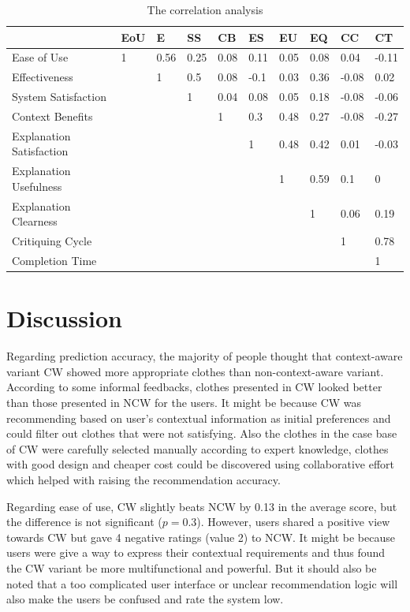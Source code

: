 \begin{table}[H]
	\centering
	\caption{The correlation analysis}
	\label{tab:correlation}
	\small
	\begin{tabular}{p{1.2in}p{0.3in}p{0.3in}p{0.3in}p{0.3in}p{0.3in}p{0.3in}p{0.3in}p{0.3in}p{0.3in}}
	          \hline
		 & EoU & E & SS & CB & ES & EU & EQ & CC & CT \\ \hline
		Ease of Use & 1 & 0.56 & 0.25 & 0.08 & 0.11 & 0.05 & 0.08 & 0.04 & -0.11 \\
		Effectiveness &  & 1 & 0.5 & 0.08 & -0.1 & 0.03 & 0.36 & -0.08 & 0.02 \\
		System Satisfaction &  &  & 1 & 0.04 & 0.08 & 0.05 & 0.18 & -0.08 & -0.06 \\
		Context Benefits &  &  &  & 1 & 0.3 & 0.48 & 0.27 & -0.08 & -0.27 \\
		Explanation Satisfaction &  &  &  &  & 1 & 0.48 & 0.42 & 0.01 & -0.03 \\
		Explanation Usefulness &  &  &  &  &  & 1 & 0.59 & 0.1 & 0 \\
		Explanation Clearness &  &  &  &  &  &  & 1 & 0.06 & 0.19 \\
		Critiquing Cycle &  &  &  &  &  &  &  & 1 & 0.78 \\
		Completion Time &  &  &  &  &  &  &  &  & 1 \\ \hline
	\end{tabular}
\end{table}

\section{Discussion} \label{sec:discussion}

Regarding prediction accuracy, the majority of people thought that context-aware variant CW showed more appropriate clothes than non-context-aware variant. According to some informal feedbacks, clothes presented in CW looked better than those presented in NCW for the users. It might be because CW was recommending based on user's contextual information as initial preferences and could filter out clothes that were not satisfying. Also the clothes in the case base of CW were carefully selected manually according to expert knowledge, clothes with good design and cheaper cost could be discovered using collaborative effort which helped with raising the recommendation accuracy.

Regarding ease of use, CW slightly beats NCW by 0.13 in the average score, but the difference is not significant ($p=0.3$). However, users shared a positive view towards CW but gave 4 negative ratings (value 2) to NCW. It might be because users were give a way to express their contextual requirements and thus found the CW variant be more multifunctional and powerful. But it should also be noted that a too complicated user interface or unclear recommendation logic will also make the users be confused and rate the system low.

